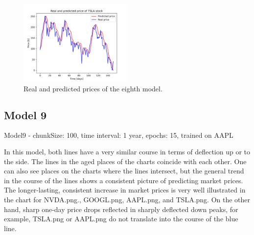 \begin{figure}
\includegraphics[width=0.5\textwidth]{./graf/model8/TSLA.png}
\caption{Real and predicted prices of the eighth model.}
\label{fig:label}
\end{figure} 

\clearpage
\subsection{Model 9}

Model9 - chunkSize: 100, time interval: 1 year, epochs: 15, trained on AAPL\par\bigskip
In this model, both lines have a very similar course in terms of deflection up or to the side. The lines
in the aged places of the charts coincide with each other. One can also see places on the charts
where the lines intersect, but the general trend in the course of the lines shows a consistent picture
of predicting market prices. The longer-lasting, consistent increase in market prices is very well
illustrated in the chart for NVDA.png., GOOGL.png, AAPL.png, and TSLA.png. On the other hand,
sharp one-day price drops reflected in sharply deflected down peaks, for example, TSLA.png or AAPL.png
do not translate into the course of the blue line.

